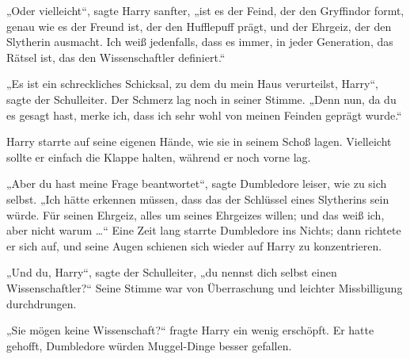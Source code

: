 „Oder vielleicht“, sagte Harry sanfter, „ist es der Feind, der den Gryffindor formt, genau wie es der Freund ist, der den Hufflepuff prägt, und der Ehrgeiz, der den Slytherin ausmacht. Ich weiß jedenfalls, dass es immer, in jeder Generation, das Rätsel ist, das den Wissenschaftler definiert.“

„Es ist ein schreckliches Schicksal, zu dem du mein Haus verurteilst, Harry“, sagte der Schulleiter. Der Schmerz lag noch in seiner Stimme.
„Denn nun, da du es gesagt hast, merke ich, dass ich sehr wohl von meinen Feinden geprägt wurde.“

Harry starrte auf seine eigenen Hände, wie sie in seinem Schoß lagen. Vielleicht sollte er einfach die Klappe halten, während er noch vorne lag.

„Aber du hast meine Frage beantwortet“, sagte Dumbledore leiser, wie zu sich selbst.
„Ich hätte erkennen müssen, dass das der Schlüssel eines Slytherins sein würde. Für seinen Ehrgeiz, alles um seines Ehrgeizes willen; und das weiß ich, aber nicht warum …“ Eine Zeit lang starrte Dumbledore ins Nichts; dann richtete er sich auf, und seine Augen schienen sich wieder auf Harry zu konzentrieren.

„Und du, Harry“, sagte der Schulleiter, „du nennst dich selbst einen Wissenschaftler?“ Seine Stimme war von Überraschung und leichter Missbilligung durchdrungen.

„Sie mögen keine Wissenschaft?“ fragte Harry ein wenig erschöpft. Er hatte gehofft, Dumbledore würden Muggel-Dinge besser gefallen.

